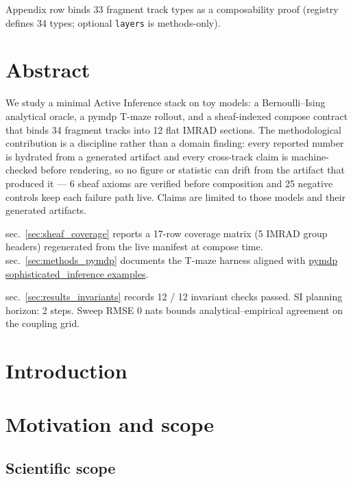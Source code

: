 \documentclass[
  english,
]{article}
\begin{document}
Appendix row  binds 33 fragment
track types as a composability proof (registry defines 34 types;
optional \texttt{layers} is methods-only).

\newpage

\section{Abstract}\label{sec:abstract}

We study a minimal Active Inference stack on toy models: a
Bernoulli--Ising analytical oracle, a pymdp T-maze rollout, and a
sheaf-indexed compose contract that binds 34 fragment tracks into 12
flat IMRAD sections. The methodological contribution is a discipline
rather than a domain finding: every reported number is hydrated from a
generated artifact and every cross-track claim is machine-checked before
rendering, so no figure or statistic can drift from the artifact that
produced it --- 6 sheaf axioms are verified before composition and 25
negative controls keep each failure path live. Claims are limited to
those models and their generated artifacts.

sec.~\ref{sec:sheaf_coverage} reports a 17-row coverage matrix (5 IMRAD
group headers) regenerated from the live manifest at compose time.
sec.~\ref{sec:methods_pymdp} documents the T-maze harness aligned with
\href{https://github.com/infer-actively/pymdp/tree/main/examples/experimental/sophisticated_inference}{pymdp
sophisticated\_inference examples}.

sec.~\ref{sec:results_invariants} records 12 / 12 invariant checks
passed. SI planning horizon: 2 steps. Sweep RMSE 0 nats bounds
analytical--empirical agreement on the coupling grid.

\newpage

{}
\section*{Introduction}

\section{Motivation and scope}\label{sec:intro_motivation}

\subsection{Scientific scope}\label{scientific-scope}
\end{document}
